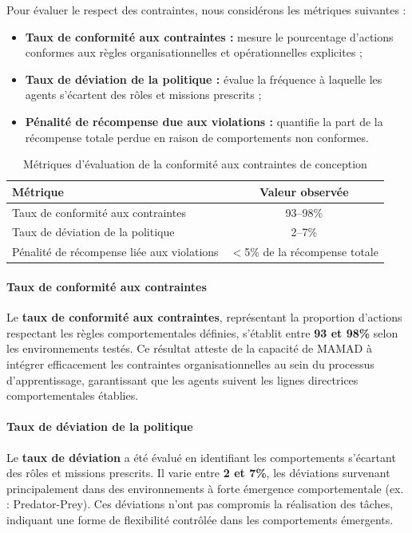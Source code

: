 Pour évaluer le respect des contraintes, nous considérons les métriques suivantes :

\begin{itemize}
    \item \textbf{Taux de conformité aux contraintes :} mesure le pourcentage d'actions conformes aux règles organisationnelles et opérationnelles explicites ;
    \item \textbf{Taux de déviation de la politique :} évalue la fréquence à laquelle les agents s'écartent des rôles et missions prescrits ;
    \item \textbf{Pénalité de récompense due aux violations :} quantifie la part de la récompense totale perdue en raison de comportements non conformes.
\end{itemize}

\begin{table}[h!]
    \centering
    \caption{Métriques d'évaluation de la conformité aux contraintes de conception}
    \begin{tabular}{lc}
        \hline
        \textbf{Métrique}                                & \textbf{Valeur observée} \\
        \hline
        Taux de conformité aux contraintes               & 93--98\%                  \\
        \hline
        Taux de déviation de la politique                & 2--7\%                    \\
        \hline
        Pénalité de récompense liée aux violations       & $<$5\% de la récompense totale \\
        \hline
    \end{tabular}
    \label{tab:compliance_fr}
\end{table}

\paragraph{Taux de conformité aux contraintes}
Le \textbf{taux de conformité aux contraintes}, représentant la proportion d'actions respectant les règles comportementales définies, s'établit entre \textbf{93 et 98\%} selon les environnements testés. Ce résultat atteste de la capacité de MAMAD à intégrer efficacement les contraintes organisationnelles au sein du processus d'apprentissage, garantissant que les agents suivent les lignes directrices comportementales établies.

\paragraph{Taux de déviation de la politique}
Le \textbf{taux de déviation} a été évalué en identifiant les comportements s'écartant des rôles et missions prescrits. Il varie entre \textbf{2 et 7\%}, les déviations survenant principalement dans des environnements à forte émergence comportementale (ex. : Predator-Prey). Ces déviations n'ont pas compromis la réalisation des tâches, indiquant une forme de flexibilité contrôlée dans les comportements émergents.

